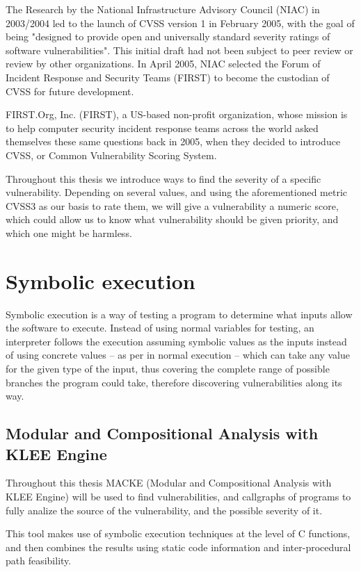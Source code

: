 The Research by the National Infrastructure Advisory Council (NIAC) in 2003/2004 led to the launch of CVSS version 1 in February 2005, with the goal of being "designed to provide open and universally standard severity ratings of software vulnerabilities". This initial draft had not been subject to peer review or review by other organizations. In April 2005, NIAC selected the Forum of Incident Response and Security Teams (FIRST) to become the custodian of CVSS for future development. 

FIRST.Org, Inc. (FIRST), a US-based non-profit organization, whose mission is to help computer security incident response teams across the world\parencite{cvss3} asked themselves these same questions back in 2005, when they decided to introduce CVSS, or Common Vulnerability Scoring System\parencite{cvss3}.

Throughout this thesis we introduce ways to find the severity of a specific vulnerability. Depending on several values, and using the aforementioned metric CVSS3 as our basis to rate them, we will give a vulnerability a numeric score, which could allow us to know what vulnerability should be given priority, and which one might be harmless.

\section{Symbolic execution}

Symbolic execution is a way of testing a program to determine what inputs allow the software to execute. Instead of using normal variables for testing, an interpreter follows the execution assuming symbolic values as the inputs instead of using concrete values -- as per in normal execution -- which can take any value for the given type of the input, thus covering the complete range of possible branches the program could take, therefore discovering vulnerabilities along its way.


\subsection{Modular and Compositional Analysis with KLEE Engine}

Throughout this thesis MACKE (Modular and Compositional Analysis with KLEE Engine)\parencite{ognawala} will be used to find vulnerabilities, and callgraphs of programs to fully analize the source of the vulnerability, and the possible severity of it.

This tool makes use of symbolic execution techniques at the level of C functions, and then combines the results using static code information and inter-procedural path feasibility\parencite{ognawala}.

